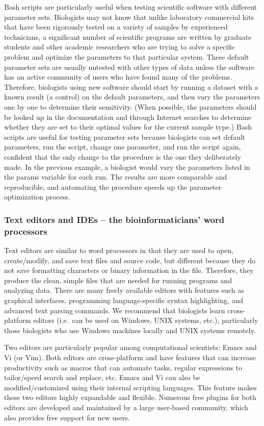 \documentclass[ChapterTOCs,krantz2]{krantz} %
\begin{document}
Bash scripts are particularly useful when testing scientific software with
different parameter sets.  Biologists may not know that
unlike laboratory commercial kits that have been rigorously tested on a
variety of samples by experienced technicians, a significant
number of scientific programs are written by graduate students and other
academic researchers who are trying to solve a specific problem and optimize
the parameters to that particular system.  These default parameter sets are
usually untested with other types of data unless the software
has an active community of users who
have found many of the problems.  Therefore, biologists using new
software should start by running a dataset with a known result (a control) on
the default parameters, and then vary the parameters one by one to determine
their sensitivity.  (When possible, the parameters should be looked up in the
documentation and through Internet searches to determine whether they are set
to their optimal values for the current sample type.)  Bash scripts are useful
for testing parameter sets because biologists can set default parameters, run
the script, change one parameter, and run the script again, confident that the
only change to the procedure is the one they deliberately made.  In the
previous example, a biologist would vary the parameters listed in the params
variable for each run.  The results are more comparable and reproducible, and
automating the procedure speeds up the parameter optimization process.

\subsubsection{Text editors and IDEs -- the bioinformaticians' word processors}

Text editors are 
similar to word processors in that they are used to open,
create/modify, and save text files and source code, but different because they
do not save formatting characters or binary information in the file.
Therefore, they produce the clean, simple files that are needed for running programs
and analyzing data.  There are many freely available editors with features such
as graphical interfaces, programming language-specific syntax
highlighting, and advanced text parsing commands. 
We recommend that biologists learn cross-platform editors
(i.e.\ can be used on Windows, UNIX systems, etc.), particularly
those biologists who use Windows machines locally and UNIX systems
remotely.

Two editors are particularly popular among computational scientists: Emacs and Vi (or Vim).
Both editors are cross-platform and have features that can increase productivity
such as macros that can automate tasks, regular expressions to 
tailor/speed search and replace, etc.
Emacs and Vi can also be modified/customized using 
their internal scripting languages.
This feature makes these two editors highly expandable and flexible.
Numerous free plugins for both editors are developed and maintained by a
large user-based community, which also provides free support for new users.
\end{document}

